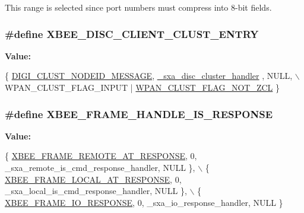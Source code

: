 This range is selected since port numbers must compress into 8-\/bit fields. \hypertarget{group___s_x_a_ga93a9155944812240b991ee57b5ef0ada}{
\subsubsection[{X\-B\-E\-E\-\_\-\-D\-I\-S\-C\-\_\-\-C\-L\-I\-E\-N\-T\-\_\-\-C\-L\-U\-S\-T\-\_\-\-E\-N\-T\-R\-Y}]{\setlength{\rightskip}{0pt plus 5cm}\#define X\-B\-E\-E\-\_\-\-D\-I\-S\-C\-\_\-\-C\-L\-I\-E\-N\-T\-\_\-\-C\-L\-U\-S\-T\-\_\-\-E\-N\-T\-R\-Y}}\label{group___s_x_a_ga93a9155944812240b991ee57b5ef0ada}
{\bfseries Value\-:}
\begin{DoxyCode}
\{ \hyperlink{group__wpan__aps_gga1227ab13b41d82d9c9c9080662f74cf7ad19431fd18576cc8463e8ac362a8579c}{DIGI\_CLUST\_NODEID\_MESSAGE}, \hyperlink{group___s_x_a_ga7129f2a09a9a49d26c50cbff75e50232}{\_sxa\_disc\_cluster\_handler}
      , NULL,      \(\backslash\)
      WPAN\_CLUST\_FLAG\_INPUT | \hyperlink{group__wpan__aps_gacb0e365a8c5e72ee90be503513e7e630}{WPAN\_CLUST\_FLAG\_NOT\_ZCL} \}
\end{DoxyCode}
\hypertarget{group___s_x_a_ga4ef8415bf147396546ed97d7fc7ef8fd}{
\subsubsection[{X\-B\-E\-E\-\_\-\-F\-R\-A\-M\-E\-\_\-\-H\-A\-N\-D\-L\-E\-\_\-\-I\-S\-\_\-\-R\-E\-S\-P\-O\-N\-S\-E}]{\setlength{\rightskip}{0pt plus 5cm}\#define X\-B\-E\-E\-\_\-\-F\-R\-A\-M\-E\-\_\-\-H\-A\-N\-D\-L\-E\-\_\-\-I\-S\-\_\-\-R\-E\-S\-P\-O\-N\-S\-E}}\label{group___s_x_a_ga4ef8415bf147396546ed97d7fc7ef8fd}
{\bfseries Value\-:}
\begin{DoxyCode}
\{ \hyperlink{group__xbee__device_gga7753bbebaf00d6d64942f64b6ae9b7b9a3cd726459592fab4cdc9b5e6bbecb79f}{XBEE\_FRAME\_REMOTE\_AT\_RESPONSE}, 0, 
      \_sxa\_remote\_is\_cmd\_response\_handler, NULL \}, \(\backslash\)
   \{ \hyperlink{group__xbee__device_gga7753bbebaf00d6d64942f64b6ae9b7b9ae66771334070219cd098c8201936cf4a}{XBEE\_FRAME\_LOCAL\_AT\_RESPONSE}, 0, 
      \_sxa\_local\_is\_cmd\_response\_handler, NULL \}, \(\backslash\)
   \{ \hyperlink{group__xbee__device_gga7753bbebaf00d6d64942f64b6ae9b7b9abd1291a130de887d7b01cae0f5adbe25}{XBEE\_FRAME\_IO\_RESPONSE}, 0, \_sxa\_io\_response\_handler,
       NULL \}
\end{DoxyCode}


